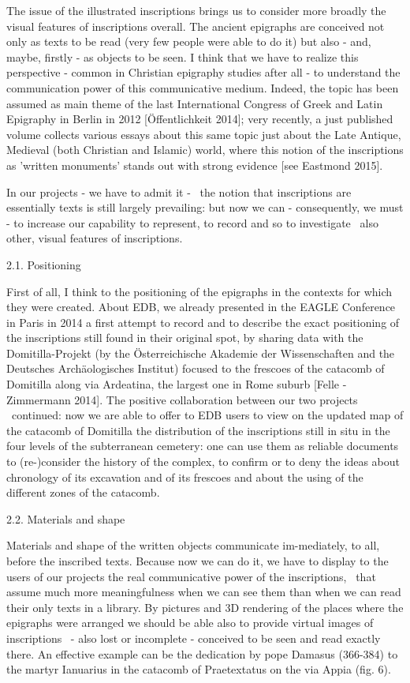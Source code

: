 \documentclass[amsthm,ebook]{saparticle}
\begin{document}
The issue of the {\textquotedbl}illustrated inscriptions{\textquotedbl} brings us to consider more broadly the visual
features of inscriptions overall. The ancient epigraphs are conceived not only as texts to be read (very few people
were able to do it) but also - and, maybe, firstly - as objects to be seen. I think that we have to realize this
perspective - common in Christian epigraphy studies after all - to understand the communication power of this
communicative medium. Indeed, the topic has been assumed as main theme of the last International Congress of Greek and
Latin Epigraphy in Berlin in 2012 [Öffentlichkeit 2014]; very recently, a just published volume collects various essays
about this same topic just about the Late Antique, Medieval (both Christian and Islamic) world, where this notion of
the inscriptions as 'written monuments' stands out with strong evidence [see Eastmond 2015]. 

In our projects - we have to admit it - \ the notion that inscriptions are essentially texts is still largely
prevailing: but now we can - consequently, we must - to increase our capability to represent, to record and so to
investigate \ also other, visual features of inscriptions. 


\bigskip

2.1. Positioning

First of all, I think to the positioning of the epigraphs in the contexts for which they were created. About EDB, we
already presented in the EAGLE Conference in Paris in 2014 a first attempt to record and to describe the exact
positioning of the inscriptions still found in their original spot, by sharing data with the Domitilla-Projekt (by the
Österreichische Akademie der Wissenschaften and the Deutsches Archäologisches Institut) focused to the frescoes of the
catacomb of Domitilla along via Ardeatina, the largest one in Rome suburb [Felle - Zimmermann 2014]. The positive
collaboration between our two projects \ continued: now we are able to offer to EDB users to view on the updated map of
the catacomb of Domitilla the distribution of the inscriptions still in situ in the four levels of the subterranean
cemetery: one can use them as reliable documents to (re-)consider the history of the complex, to confirm or to deny the
ideas about chronology of its excavation and of its frescoes and about the using of the different zones of the
catacomb.


\bigskip

2.2. Materials and shape 

Materials and shape of the written objects communicate im-mediately, to all, before the inscribed texts. Because now we
can do it, we have to display to the users of our projects the real communicative power of the inscriptions, \ that
assume much more meaningfulness when we can see them than when we can read their only texts in a library. By pictures
and 3D rendering of the places where the epigraphs were arranged we should be able also to provide virtual images of
inscriptions \ {}- also lost or incomplete - conceived to be seen and read exactly there. An effective example can be
the dedication by pope Damasus (366-384) to the martyr Ianuarius in the catacomb of Praetextatus on the via Appia (fig.
6). 
\end{document}
